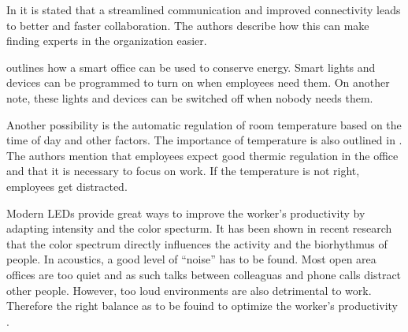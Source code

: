 In \cite{hbcommunications} it is stated that a streamlined communication and improved connectivity leads to better and faster collaboration. The authors describe how this can make finding experts in the organization easier.


\cite{hbcommunications} outlines how a smart office can be used to conserve energy. Smart lights and devices can be programmed to turn on when employees need them. On another note, these lights and devices can be switched off when nobody needs them.

Another possibility is the automatic regulation of room temperature based on the time of day and other factors. The importance of temperature is also outlined in \cite{living-lab}. The authors mention that employees expect good thermic regulation in the office and that it is necessary to focus on work. If the temperature is not right, employees get distracted. 


Modern LEDs provide great ways to improve the worker's productivity by adapting intensity and the color specturm. It has been shown in recent research that the color spectrum directly influences the activity and the biorhythmus of people. In acoustics, a good level of ``noise'' has to be found. Most open area offices are too quiet and as such talks between colleaguas and phone calls distract other people. However, too loud environments are also detrimental to work. Therefore the right balance as to be fouind to optimize the worker's productivity \cite{living-lab}.
